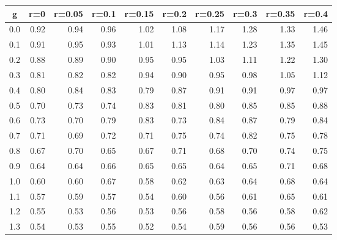 %
\begin{table}[!tbp]
 \begin{center}
 \begin{tabular}{rrrrrrrrrr}\hline\hline
\multicolumn{1}{c}{g}&\multicolumn{1}{c}{r=0}&\multicolumn{1}{c}{r=0.05}&\multicolumn{1}{c}{r=0.1}&\multicolumn{1}{c}{r=0.15}&\multicolumn{1}{c}{r=0.2}&\multicolumn{1}{c}{r=0.25}&\multicolumn{1}{c}{r=0.3}&\multicolumn{1}{c}{r=0.35}&\multicolumn{1}{c}{r=0.4}\tabularnewline
\hline
0.0&0.92&0.94&0.96&1.02&1.08&1.17&1.28&1.33&1.46\tabularnewline
0.1&0.91&0.95&0.93&1.01&1.13&1.14&1.23&1.35&1.45\tabularnewline
0.2&0.88&0.89&0.90&0.95&0.95&1.03&1.11&1.22&1.30\tabularnewline
0.3&0.81&0.82&0.82&0.94&0.90&0.95&0.98&1.05&1.12\tabularnewline
0.4&0.80&0.84&0.83&0.79&0.87&0.91&0.91&0.97&0.97\tabularnewline
0.5&0.70&0.73&0.74&0.83&0.81&0.80&0.85&0.85&0.88\tabularnewline
0.6&0.73&0.70&0.79&0.83&0.73&0.84&0.87&0.79&0.84\tabularnewline
0.7&0.71&0.69&0.72&0.71&0.75&0.74&0.82&0.75&0.78\tabularnewline
0.8&0.67&0.70&0.65&0.67&0.71&0.68&0.70&0.74&0.75\tabularnewline
0.9&0.64&0.64&0.66&0.65&0.65&0.64&0.65&0.71&0.68\tabularnewline
1.0&0.60&0.60&0.67&0.58&0.62&0.63&0.64&0.68&0.64\tabularnewline
1.1&0.57&0.59&0.57&0.54&0.60&0.56&0.61&0.65&0.61\tabularnewline
1.2&0.55&0.53&0.56&0.53&0.56&0.58&0.56&0.58&0.62\tabularnewline
1.3&0.54&0.53&0.55&0.52&0.54&0.59&0.56&0.56&0.53\tabularnewline
\hline
\end{tabular}

\end{center}

\end{table}

